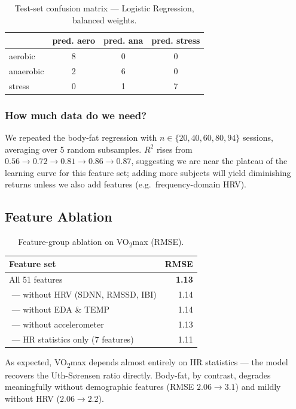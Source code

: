 \documentclass[sigconf,nonacm]{acmart}
\begin{document}
\begin{table}[h]
\centering
\caption{Test-set confusion matrix --- Logistic Regression, balanced weights.}
\label{tab:cm}
\begin{tabular}{l|ccc}
           & pred. aero & pred. ana & pred. stress \\
\hline
aerobic    & 8 & 0 & 0 \\
anaerobic  & 2 & 6 & 0 \\
stress     & 0 & 1 & 7 \\
\end{tabular}
\end{table}

\subsubsection{How much data do we need?}
We repeated the body-fat regression with $n\!\in\!\{20,40,60,80,94\}$
sessions, averaging over 5 random subsamples. $R^{2}$ rises from
$0.56\!\to\!0.72\!\to\!0.81\!\to\!0.86\!\to\!0.87$, suggesting we are
near the plateau of the learning curve for this feature set; adding
more subjects will yield diminishing returns unless we also add
features (e.g.\ frequency-domain HRV).

\subsection{Feature Ablation}

\begin{table}[h]
\centering
\caption{Feature-group ablation on VO\textsubscript{2}max (RMSE).}
\begin{tabular}{@{}lr@{}}
\toprule
Feature set                              & RMSE \\
\midrule
All 51 features                          & \textbf{1.13} \\
\,\,--- without HRV (SDNN, RMSSD, IBI)   & 1.14 \\
\,\,--- without EDA \& TEMP              & 1.14 \\
\,\,--- without accelerometer            & 1.13 \\
\,\,--- HR statistics only (7 features)  & 1.11 \\
\bottomrule
\end{tabular}
\end{table}

As expected, VO\textsubscript{2}max depends almost entirely on HR
statistics --- the model recovers the Uth-S{\o}rensen ratio directly.
Body-fat, by contrast, degrades meaningfully without demographic
features (RMSE $2.06\!\to\!3.1$) and mildly without HRV
($2.06\!\to\!2.2$).
\end{document}

